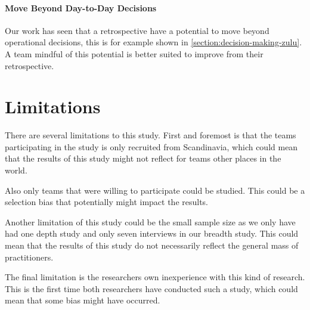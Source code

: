 \paragraph{Move Beyond Day-to-Day Decisions}
Our work has seen that a retrospective have a potential to move beyond operational decisions, this is for example shown in \autoref{section:decision-making-zulu}. A team mindful of this potential is better suited to improve from their retrospective.
 
\section{Limitations}
There are several limitations to this study. First and foremost is that the teams participating in the study is only recruited from Scandinavia, which could mean that the results of this study might not reflect for teams other places in the world. 

Also only teams that were willing to participate could be studied. This could be a selection bias that potentially might impact the results.

Another limitation of this study could be the small sample size as we only have had one depth study and only seven interviews in our breadth study. This could mean that the results of this study do not necessarily reflect the general mass of practitioners. 

The final limitation is the researchers own inexperience with this kind of research. This is the first time both researchers have conducted such a study, which could mean that some bias might have occurred.

\clearpage
